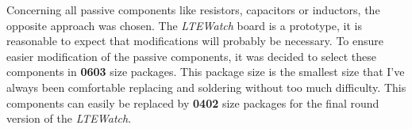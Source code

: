 \documentclass[report.tex]{subfiles}
\begin{document}
Concerning all passive components like resistors, capacitors or inductors, the opposite approach was chosen. The \textit{LTEWatch} board is a prototype, it is reasonable to expect that modifications will probably be necessary. To ensure easier modification of the passive components, it was decided to select these components in \textbf{0603} size packages. This package size is the smallest size that I've always been comfortable replacing and soldering without too much difficulty. This components can easily be replaced by \textbf{0402} size packages for the final round version of the \textit{LTEWatch}.
\end{document}
